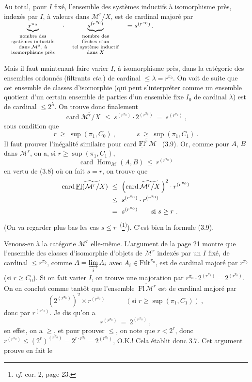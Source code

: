 \documentclass[11pt]{article}
\newcommand{\printedpage}[1]{\marginpar{\footnotesize p.~#1}}
\newcommand{\msp}[1]{\marginpar{\footnotesize [#1]}}
\newcommand{\M}{\mathcal{M}}
\newcommand{\Fl}{\mathrm{Fl}}
\newcommand{\uFl}{\underline{\mathrm{Fl}}}
\newcommand{\Filt}{\mathrm{Filt}}
\newcommand{\card}{\operatorname{card}}
\newcommand{\Hom}{\operatorname{Hom}}
\newcommand{\wavy}[1]{\widetilde{#1}}
\begin{document}
Au total, pour $I$ fixé, l'ensemble des systèmes inductifs à isomorphisme près, indexés par $I$, à valeurs dans $\M^r/X$, est \msp{page 22} de cardinal majoré par $\quad\underbrace{r^{\pi_0}}_{\text{\scriptsize\begin{tabular}{@{}c@{}}nombre des\\ systèmes inductifs\\ dans $\M^\pi$, à\\ isomorphisme près\end{tabular}}}\quad\cdot\quad\underbrace{s^{(r^{\pi_0})}}_{\text{\scriptsize\begin{tabular}{@{}c@{}}nombre des\\ flèches d'un\\ tel système inductif\\ dans $X$\end{tabular}}}\quad=s^{(r^{\pi_0})}$.

Mais il faut maintenant faire varier $I$, à isomorphisme près, dans la catégorie des ensembles ordonnés (filtrants \textit{etc.}) de cardinal $\leq\lambda=r^{\pi_0}$. On voit de suite que cet ensemble de classes d'isomorphie (qui peut s'interpréter comme un ensemble quotient d'un certain ensemble de parties d'un ensemble fixe $I_0$ de cardinal $\lambda$) est de cardinal $\leq 2^\lambda$. On trouve donc finalement
\[
\card\wavy{\M^r/X}\ \ \leq\ s^{(r^{\pi_0})}\cdot 2^{(r^{\pi_0})}\ =\ s^{(r^{\pi_0})}\ ,
\]
sous condition que
\[
r\ \geq\ \sup(\pi_1,C_0)\ ,\qquad\quad s\ \geq\ \sup(\pi_1,C_1)\ .
\]
Il faut prouver l'inégalité similaire pour card $\wavy{\uFl^r\,\M}$ \ (3.9). Or, comme pour $A$, $B$ dans $\M^r$, on a, si $r\geq\sup(\pi_1,C_1)$,
\[
\card\Hom_{\M}(A,B)\ \leq\ r^{(r^{\pi_0})}
\]
en vertu de (3.8) où on fait $s=r$, on trouve que
\[
\begin{aligned}
\card\wavy{\uFl(\M^r/X)}\ &\leq\ \Bigl(\card\wavy{\M^r/X}\,\Bigr)^2\cdot r^{(r^{\pi_0})}\\
&\leq\ s^{(r^{\pi_0})}\cdot r^{(r^{\pi_0})}\\
&=\ s^{(r^{\pi_0})}\qquad\text{si } s\geq r\ .
\end{aligned}
\]
(On va regarder plus bas les cas $s\leq r$~\textsuperscript{(}\footnote[8]{\textit{cf.} cor. 2, page 23.}\textsuperscript{)}). C'est bien la formule (3.9).

\printedpage{16}
\msp{page 23}
Venons-en à la catégorie $\M^r$ elle-même. L'argument de la page 21 montre que l'ensemble des classes d'isomorphie d'objets de $\M^r$ indexés par un $I$ fixé, de cardinal $\leq r^{\pi_0}$, comme $A=\varinjlim\limits_i A_i$ avec $A_i\in\Filt^{\pi_0}$, est de cardinal majoré par $r^{\pi_0}$ (si $r\geq C_0$). Si on fait varier $I$, on trouve une majoration par $r^{\pi_0}\cdot 2^{(r^{\pi_0})}=2^{(r^{\pi_0})}$. On en conclut comme tantôt que l'ensemble $\ \wavy{\Fl\,\M^r}$ est de cardinal majoré par
\[
(2^{(r^{\pi_0})})^2\times r^{(r^{\pi_0})}\qquad\quad(\text{si } r\geq\sup(\pi_1,C_1))\ ,
\]
donc par $r^{(r^{\pi_0})}$. Je dis qu'on a
\[
r^{(r^{\pi_0})}\ =\ 2^{(r^{\pi_0})}\ ,
\]
en effet, on a $\geq$, et pour prouver $\leq$, on note que $r<2^r$, donc $r^{(r^{\pi_0})}\leq(2^r)^{(r^{\pi_0})}=2^{r\cdot r^{\pi_0}}=2^{(r^{\pi_0})}$, O.K.! Cela établit donc 3.7. Cet argument prouve en fait le
\end{document}

